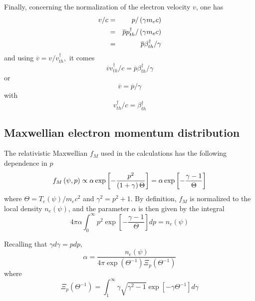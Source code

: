 Finally, concerning the normalization of the electron velocity $v$, one has 
\begin{eqnarray}
v/c &=&p/\left( \gamma m_{e}c\right)  \notag \\
&=&\overline{p}p_{th}^{\dag }/\left( \gamma m_{e}c\right)  \notag \\
&=&\overline{p}\beta _{th}^{\dag }/\gamma
\end{eqnarray}
and using $\overline{v}=v/v_{th}^{\dag },$ it comes 
\begin{equation}
\overline{v}v_{th}^{\dag }/c=\overline{p}\beta _{th}^{\dag }/\gamma
\end{equation}
or 
\begin{equation}
\overline{v}=\overline{p}/\gamma
\end{equation}
with 
\begin{equation}
v_{th}^{\dag }/c=\beta _{th}^{\dag }
\end{equation}

\subsection{Maxwellian electron momentum distribution}

\label{normmaxwellian}The relativistic Maxwellian $f_{M}$ used in the
calculations has the following dependence in $p$%
\begin{equation}
f_{M}\left( \psi ,p\right) \propto \alpha \exp \left[ -\frac{p^{2}}{\left(
1+\gamma \right) \Theta }\right] =\alpha \exp \left[ -\frac{\gamma -1}{%
\Theta }\right]
\end{equation}
where $\Theta =T_{e}\left( \psi \right) /m_{e}c^{2}$ and $\gamma
^{2}=p^{2}+1.$ By definition, $f_{M}$ is normalized to the local density $%
n_{e}\left( \psi \right) $, and the parameter $\alpha $ is then given by the
integral 
\begin{equation}
4\pi \alpha \int_{0}^{\infty }p^{2}\exp \left[ -\frac{\gamma -1}{\Theta }%
\right] dp=n_{e}\left( \psi \right)
\end{equation}

Recalling that $\gamma d\gamma =pdp,$ 
\begin{equation}
\alpha =\frac{n_{e}\left( \psi \right) }{4\pi \exp \left( \Theta
^{-1}\right) \Xi _{p}\left( \Theta ^{-1}\right) }
\end{equation}
where 
\begin{equation}
\Xi _{p}\left( \Theta ^{-1}\right) =\int_{1}^{\infty }\gamma \sqrt{\gamma
^{2}-1}\exp \left[ -\gamma \Theta ^{-1}\right] d\gamma
\end{equation}

